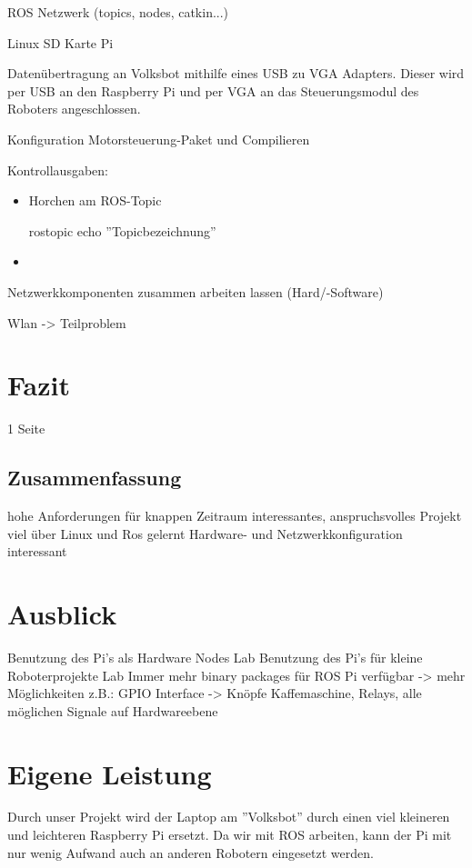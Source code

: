 \documentclass[12pt]{article}
\begin{document}
ROS Netzwerk (topics, nodes, catkin...)


Linux SD Karte Pi


Datenübertragung an Volksbot mithilfe eines USB zu VGA Adapters. Dieser wird per USB an den Raspberry Pi und per VGA an das Steuerungsmodul des Roboters angeschlossen.


Konfiguration Motorsteuerung-Paket und Compilieren


Kontrollausgaben:
\begin{itemize}

\item Horchen am ROS-Topic

\subitem rostopic echo ''Topicbezeichnung''

\item 

\end{itemize}

Netzwerkkomponenten zusammen arbeiten lassen (Hard/-Software)


Wlan -> Teilproblem




\section{Fazit}
1 Seite
\subsection{Zusammenfassung}

hohe Anforderungen für knappen Zeitraum
interessantes, anspruchsvolles Projekt
viel über Linux und Ros gelernt
Hardware- und Netzwerkkonfiguration interessant

\section{Ausblick}

Benutzung des Pi's als Hardware Nodes Lab
Benutzung des Pi's für kleine Roboterprojekte Lab
Immer mehr binary packages für ROS Pi verfügbar -> mehr Möglichkeiten
z.B.: GPIO Interface -> Knöpfe Kaffemaschine, Relays, alle möglichen Signale
auf Hardwareebene

\section{Eigene Leistung}

Durch unser Projekt wird der Laptop am ''Volksbot'' durch einen viel kleineren und leichteren Raspberry Pi ersetzt. Da wir mit ROS arbeiten, kann der Pi mit nur wenig Aufwand auch an anderen Robotern eingesetzt werden.
\end{document}
